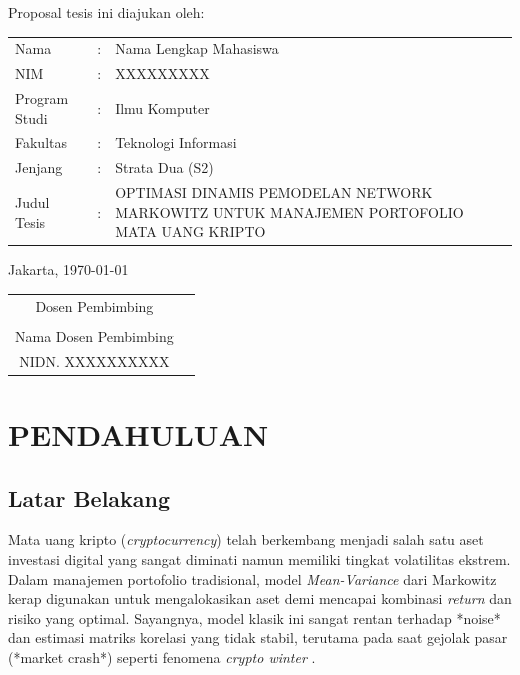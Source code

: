 \documentclass[12pt, a4paper]{report}
\newcommand{\judulProposal}{OPTIMASI DINAMIS PEMODELAN NETWORK MARKOWITZ UNTUK MANAJEMEN PORTOFOLIO MATA UANG KRIPTO}
\newcommand{\namaMahasiswa}{Nama Lengkap Mahasiswa}
\newcommand{\nimMahasiswa}{XXXXXXXXX}
\begin{document}
\vspace{0.5cm}
\noindent
Proposal tesis ini diajukan oleh:

\vspace{0.5cm}
\begin{tabular}{lll}
    Nama          & : & \namaMahasiswa \\
    NIM           & : & \nimMahasiswa \\
    Program Studi & : & Ilmu Komputer \\
    Fakultas      & : & Teknologi Informasi \\
    Jenjang       & : & Strata Dua (S2) \\
    Judul Tesis   & : & \judulProposal \\
\end{tabular}

\vspace{2cm}
\noindent
Jakarta, \today

\vspace{1cm}
\begin{tabular}{cc}
    Dosen Pembimbing & \\[3cm]
    \underline{\hspace{8cm}} & \\
    Nama Dosen Pembimbing & \\
    NIDN. XXXXXXXXXX & \\
\end{tabular}

\tableofcontents
\clearpage

\setcounter{page}{1}

\chapter{PENDAHULUAN}

\section{Latar Belakang}

Mata uang kripto (\textit{cryptocurrency}) telah berkembang menjadi salah satu aset investasi digital yang sangat diminati namun memiliki tingkat volatilitas ekstrem. Dalam manajemen portofolio tradisional, model \textit{Mean-Variance} dari Markowitz kerap digunakan untuk mengalokasikan aset demi mencapai kombinasi \textit{return} dan risiko yang optimal. Sayangnya, model klasik ini sangat rentan terhadap *noise* dan estimasi matriks korelasi yang tidak stabil, terutama pada saat gejolak pasar (*market crash*) seperti fenomena \textit{crypto winter} \cite{ref1}.
\end{document}
